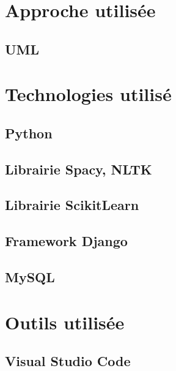 \section{Approche utilisée}
\subsection{UML}
\lipsum[1-2]

\section{Technologies utilisé}
\subsection{Python}
\subsection{Librairie Spacy, NLTK}
\subsection{Librairie ScikitLearn}
\subsection{Framework Django}


\subsection{MySQL}
\lipsum[1-2]

\section{Outils utilisée}
\lipsum[1-2]

\subsection{Visual Studio Code}
\lipsum[1-2]